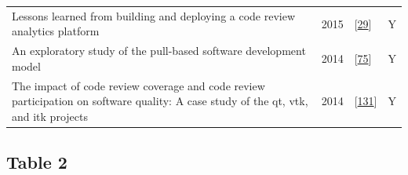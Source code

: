 \documentclass[]{book}
\begin{document}
\begin{longtable}[]{@{}llll@{}}
\begin{minipage}[t]{0.63\columnwidth}
Lessons learned from building and deploying a code review analytics
platform\strut
\end{minipage} & \begin{minipage}[t]{0.03\columnwidth}\raggedright\strut
2015\strut
\end{minipage} & \begin{minipage}[t]{0.14\columnwidth}\raggedright\strut
{[}\protect\hyperlink{ref-bird2015lessons}{29}{]}\strut
\end{minipage} & \begin{minipage}[t]{0.09\columnwidth}\raggedright\strut
Y\strut
\end{minipage}\tabularnewline
\begin{minipage}[t]{0.63\columnwidth}\raggedright\strut
An exploratory study of the pull-based software development model\strut
\end{minipage} & \begin{minipage}[t]{0.03\columnwidth}\raggedright\strut
2014\strut
\end{minipage} & \begin{minipage}[t]{0.14\columnwidth}\raggedright\strut
{[}\protect\hyperlink{ref-gousios2014exploratory}{75}{]}\strut
\end{minipage} & \begin{minipage}[t]{0.09\columnwidth}\raggedright\strut
Y\strut
\end{minipage}\tabularnewline
\begin{minipage}[t]{0.63\columnwidth}\raggedright\strut
The impact of code review coverage and code review participation on
software quality: A case study of the qt, vtk, and itk projects\strut
\end{minipage} & \begin{minipage}[t]{0.03\columnwidth}\raggedright\strut
2014\strut
\end{minipage} & \begin{minipage}[t]{0.14\columnwidth}\raggedright\strut
{[}\protect\hyperlink{ref-mcintosh2014impact}{131}{]}\strut
\end{minipage} & \begin{minipage}[t]{0.09\columnwidth}\raggedright\strut
Y\strut
\end{minipage}\tabularnewline
\bottomrule
\end{longtable}

\subsection{Table 2}\label{table-2}
\end{document}
